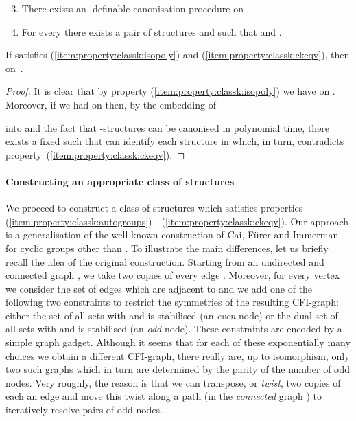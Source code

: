 \documentclass[a4paper,UKenglish]{lipics}
\theoremstyle{plain}
\begin{document}
\begin{enumerate}[]
\setcounter{enumi}{2}
 \item There exists an -definable canonisation procedure on .
\label{item:property:classk:isopoly}
 \item For every  there exists a pair of structures  and  such that  and .
\label{item:property:classk:ckeqv}
\end{enumerate}
\begin{lemma}\label{lemma:fps:fpc:prop34}
 If  satisfies  (\ref{item:property:classk:isopoly}) and
 (\ref{item:property:classk:ckeqv}), then  on~.
\end{lemma}
\begin{proof}
It is clear that by property (\ref{item:property:classk:isopoly}) we have
  on .
 Moreover, if we had  on  then,  by the embedding of 
 
into  and the fact that -structures can be canonised in 
polynomial time, there exists a fixed  such that  can identify 
each structure in  which, in turn, contradicts 
property~(\ref{item:property:classk:ckeqv}).
\end{proof}

\paragraph*{Constructing an appropriate class of structures}
We proceed to construct a class of structures  which satisfies 
properties (\ref{item:property:classk:autogroups}) - 
(\ref{item:property:classk:ckeqv}).
Our approach is a generalisation of the well-known construction of Cai, Fürer 
and Immerman~\cite{CFI92} for cyclic groups other than . 
To illustrate the main differences, let us briefly recall the idea of the 
original construction. Starting from an undirected and connected graph 
, we take two copies  of every edge .
Moreover, for every vertex  we consider the set  of 
edges which are adjacent to  and we add one of the following two constraints 
to restrict the symmetries of the resulting CFI-graph: either the set of all 
sets  with  and  is stabilised (an \emph{even} 
node) or the dual set of all sets  with 
 and  is stabilised (an 
\emph{odd} node).
These constraints are encoded by a simple graph gadget.
Although it seems that for each of these exponentially many choices we obtain a 
different CFI-graph, there really are, up to isomorphism, only two such graphs
which in turn are determined by the parity of the number of odd nodes.
Very roughly, the reason is that we can transpose, or \emph{twist}, two 
copies  of each an edge  and move this twist along a path (in the 
\emph{connected} graph ) to iteratively resolve pairs of odd nodes.
\end{document}
